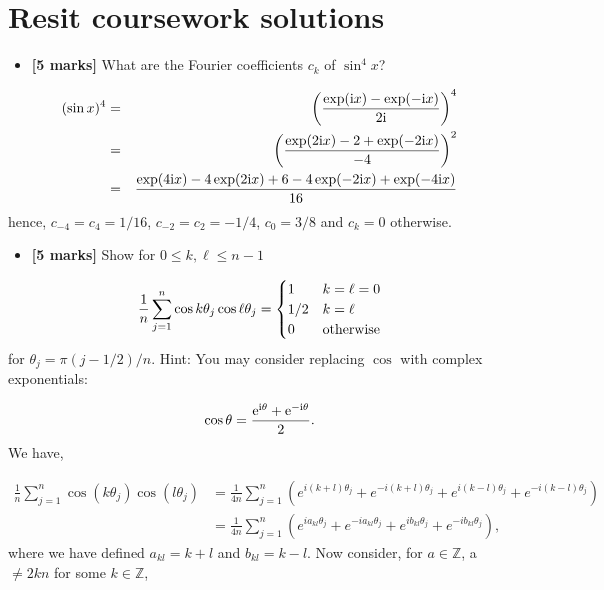 \documentclass[12pt,a4paper]{article}
\begin{document}
\section{Resit coursework solutions}
\begin{itemize}
\item[1. ] \textbf{[5 marks]} What are the Fourier coefficients $c_k$ of $\sin^4 x$?

\end{itemize}

\begin{eqnarray*}
(\sin x)^4 &=& \left({\exp({\rm i} x) - \exp(-{\rm i} x) \over 2 {\rm i}}\right)^4 \\
&=& \left({\exp(2{\rm i} x) -2 + \exp(-2{\rm i} x) \over -4}\right)^2 \\
&=& {\exp(4{\rm i} x) -4\exp(2{\rm i} x) +6 -4 \exp(-2{\rm i} x)+\exp(-4{\rm i} x) \over 16}
\end{eqnarray*}
hence, $c_{-4} = c_{4} = 1/16$, $c_{-2} = c_2 = -1/4$, $c_0 = 3/8$ and $c_k = 0$ otherwise.

\begin{itemize}
\item[2. ] \textbf{[5 marks]} Show for $0 \leq k,\ell \leq n-1$

\end{itemize}
\[
{1 \over n} \sum_{j=1}^n \cos k \theta_j \cos \ell \theta_j = \begin{cases} 1 & k = \ell = 0 \\
                                                  1/2 & k = \ell \\
                                                  0 & \hbox{otherwise}
                                                  \end{cases}
\]
for $\theta_j = \pi (j-1/2)/n$. Hint:     You may consider replacing $\cos$ with     complex exponentials:

\[
\cos \theta = {{\rm e}^{{\rm i}\theta} + {\rm e}^{-{\rm i}\theta} \over 2}.
\]
We have,


\begin{align*}
\frac{1}{n}\sum_{j=1}^n \cos(k\theta_j)\cos(l\theta_j) &= \frac{1}{4n}\sum_{j=1}^n\left( e^{i(k+l)\theta_j} + e^{-i(k+l)\theta_j} + e^{i(k-l)\theta_j} + e^{-i(k-l)\theta_j}\right) \\
&=	\frac{1}{4n}\sum_{j=1}^n \left( e^{ia_{kl}\theta_j} + e^{-ia_{kl}\theta_j} + e^{ib_{kl}\theta_j} + e^{-ib_{kl}\theta_j}\right),
\end{align*}
where we have defined $a_{kl} = k+l$ and $b_{kl} = k-l$. Now consider, for $a \in \mathbb{Z}$, a $\neq 2kn$ for some $k \in \mathbb{Z}$,
\end{document}
